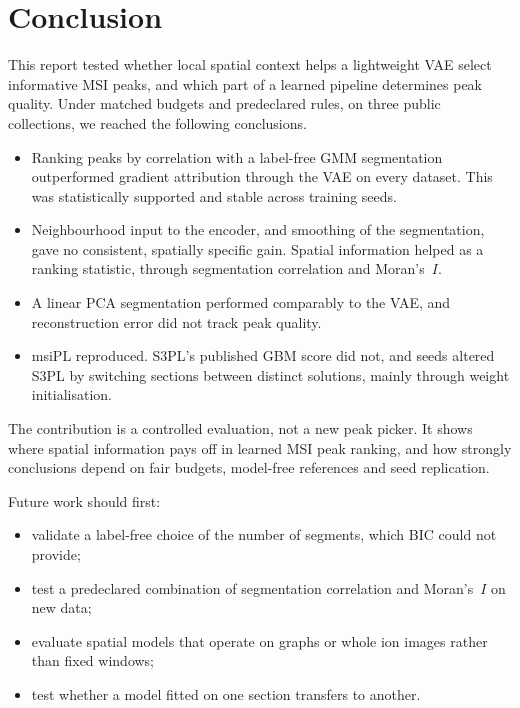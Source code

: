 \section{Conclusion}
\label{sec:conclusion}

This report tested whether local spatial context helps a lightweight VAE
select informative MSI peaks, and which part of a learned pipeline determines
peak quality. Under matched budgets and predeclared rules, on three public
collections, we reached the following conclusions.
\begin{itemize}
  \item Ranking peaks by correlation with a label-free GMM segmentation
        outperformed gradient attribution through the VAE on every dataset.
        This was statistically supported and stable across training seeds.
  \item Neighbourhood input to the encoder, and smoothing of the segmentation,
        gave no consistent, spatially specific gain. Spatial information helped
        as a ranking statistic, through segmentation correlation and
        Moran's~$I$.
  \item A linear PCA segmentation performed comparably to the VAE, and
        reconstruction error did not track peak quality.
  \item msiPL reproduced. S3PL's published GBM score did not, and seeds altered
        S3PL by switching sections between distinct solutions, mainly through
        weight initialisation.
\end{itemize}

The contribution is a controlled evaluation, not a new peak picker. It shows
where spatial information pays off in learned MSI peak ranking, and how
strongly conclusions depend on fair budgets, model-free references and seed
replication.

Future work should first:
\begin{itemize}
  \item validate a label-free choice of the number of segments, which BIC
        could not provide;
  \item test a predeclared combination of segmentation correlation and
        Moran's~$I$ on new data;
  \item evaluate spatial models that operate on graphs or whole ion images
        rather than fixed windows;
  \item test whether a model fitted on one section transfers to another.
\end{itemize}
